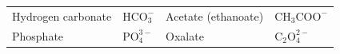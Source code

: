 {\begin{center}
\begin{xtabular*}{\mytablewidth}[t]{|p{10\mystarwidth}|p{10\mystarwidth}|p{10\mystarwidth}|p{10\mystarwidth}|}
    
        Hydrogen carbonate &
    
    
        \begin{math}\mathrm{HCO}_{3}^{-}\end{math} &
    
    
        Acetate (ethanoate) &
    
    
        \begin{math}{\mathrm{CH}}_{3}{\mathrm{COO}}^{-}\end{math}%
     \tabularnewline{}
    
    
        Phosphate &
    
    
        \begin{math}\mathrm{PO}_{4}^{3-}\end{math} &
    
    
        Oxalate &
    
    
        \begin{math}{\mathrm{C}}_{2}\mathrm{O}_{4}^{2-}\end{math}%
     \tabularnewline{}
    

\end{xtabular*}
\end{center}}
